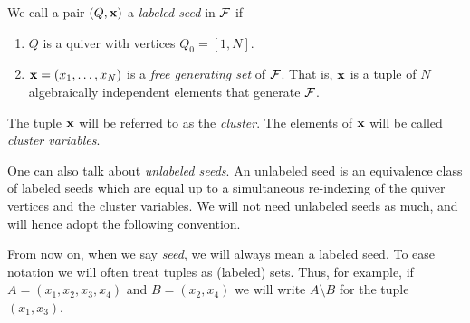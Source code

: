 \begin{definition}
	We call a pair $(Q, \mathbf{x})$ a \emph{labeled seed} in $\mathcal{F}$ if
	\begin{enumerate}
		\item $Q$ is a quiver with vertices $Q_0 = [1, N]$.
		\item $\mathbf{x} = (x_1, \dots, x_N)$ is a \emph{free generating set} of $\mathcal{F}$. That is, $\mathbf{x}$ is a tuple of $N$ algebraically independent elements that generate $\mathcal{F}$.
	\end{enumerate}
	The tuple $\mathbf{x}$ will be referred to as the \emph{cluster}. The elements of $\mathbf{x}$ will be called \emph{cluster variables}.
\end{definition}
%
One can also talk about \emph{unlabeled seeds}. An unlabeled seed
is an equivalence class of labeled seeds which are equal up to a simultaneous
re-indexing of the quiver vertices and the cluster variables. We will not need
unlabeled seeds as much, and will hence adopt the following convention.
\begin{convention}
	From now on, when we say \emph{seed}, we will always mean a labeled seed. To ease notation we will often treat tuples as (labeled) sets. Thus, for example, if $A = (x_1, x_2, x_3, x_4)$ and $B = (x_2, x_4)$ we will write $A \setminus B$ for the tuple $(x_1, x_3)$.
\end{convention}

